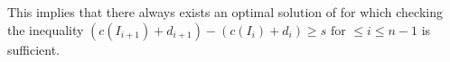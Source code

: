 %
This implies that there always exists an optimal solution of {\idisp} for which checking the inequality $(c(I_{i+1})+d_{i+1}) - (c(I_{i})+d_{i}) \ge s \text{ for } \leq i \leq n-1$ is sufficient.

